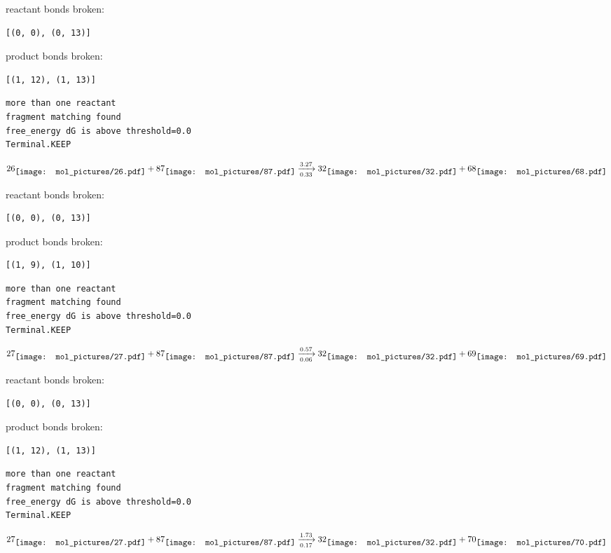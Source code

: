 \documentclass{article}
\begin{document}
reactant bonds broken:\begin{verbatim}
[(0, 0), (0, 13)]
\end{verbatim}
product bonds broken:\begin{verbatim}
[(1, 12), (1, 13)]
\end{verbatim}




\vspace{1cm}
\begin{verbatim}
more than one reactant
fragment matching found
free_energy dG is above threshold=0.0
Terminal.KEEP
\end{verbatim}
$$
26
\raisebox{-.5\height}{\texttt{[image: mol\_pictures/26.pdf]}}
+
87
\raisebox{-.5\height}{\texttt{[image: mol\_pictures/87.pdf]}}
\xrightarrow[0.33]{3.27}
32
\raisebox{-.5\height}{\texttt{[image: mol\_pictures/32.pdf]}}
+
68
\raisebox{-.5\height}{\texttt{[image: mol\_pictures/68.pdf]}}
$$


reactant bonds broken:\begin{verbatim}
[(0, 0), (0, 13)]
\end{verbatim}
product bonds broken:\begin{verbatim}
[(1, 9), (1, 10)]
\end{verbatim}




\vspace{1cm}
\begin{verbatim}
more than one reactant
fragment matching found
free_energy dG is above threshold=0.0
Terminal.KEEP
\end{verbatim}
$$
27
\raisebox{-.5\height}{\texttt{[image: mol\_pictures/27.pdf]}}
+
87
\raisebox{-.5\height}{\texttt{[image: mol\_pictures/87.pdf]}}
\xrightarrow[0.06]{0.57}
32
\raisebox{-.5\height}{\texttt{[image: mol\_pictures/32.pdf]}}
+
69
\raisebox{-.5\height}{\texttt{[image: mol\_pictures/69.pdf]}}
$$


reactant bonds broken:\begin{verbatim}
[(0, 0), (0, 13)]
\end{verbatim}
product bonds broken:\begin{verbatim}
[(1, 12), (1, 13)]
\end{verbatim}




\vspace{1cm}
\begin{verbatim}
more than one reactant
fragment matching found
free_energy dG is above threshold=0.0
Terminal.KEEP
\end{verbatim}
$$
27
\raisebox{-.5\height}{\texttt{[image: mol\_pictures/27.pdf]}}
+
87
\raisebox{-.5\height}{\texttt{[image: mol\_pictures/87.pdf]}}
\xrightarrow[0.17]{1.73}
32
\raisebox{-.5\height}{\texttt{[image: mol\_pictures/32.pdf]}}
+
70
\raisebox{-.5\height}{\texttt{[image: mol\_pictures/70.pdf]}}
$$
\end{document}
